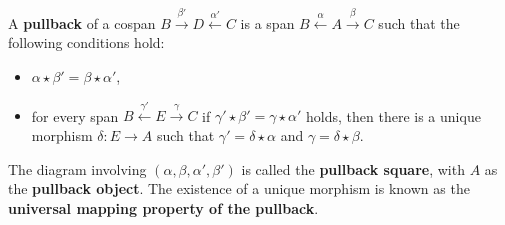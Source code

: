 \begin{definition} 
    \label{def:cat:pb}
   A \textbf{pullback} of a cospan \(B \overset{\beta'}{\rightarrow} D \overset{\alpha'}{\leftarrow} C \) 
is a span \( B \overset{\alpha}{\leftarrow} A \overset{\beta}{\rightarrow} C \) such that the following conditions hold:
\begin{itemize}
    \item  \( \alpha \mathop{\star} \beta' \mathop{=} \beta \mathop{\star} \alpha' \),
    \item for every span \( B \overset{\gamma'}{\leftarrow} E \overset{\gamma}{\rightarrow} C \) if \(\gamma' \mathop{\star} \beta' \mathop{=} \gamma \mathop{\star} \alpha'\) holds, then there is a unique morphism \(\delta: E  \mathop{\to} A\) such that $\gamma' \mathop{=} \delta \mathop{\star} \alpha$ and $\gamma \mathop{=} \delta \mathop{\star} \beta$.
\end{itemize}  
    \begin{center}
                \end{center}
The diagram involving \( (\alpha, \beta, \alpha', \beta') \) is called the \textbf{pullback square}, with \(A\) as the \textbf{pullback object}. The existence of a unique morphism is known as the \textbf{universal mapping property of the pullback}.
\end{definition} 
